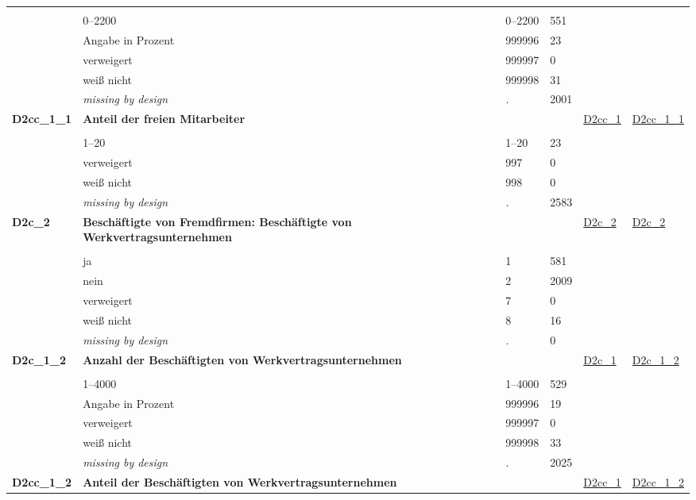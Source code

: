 \begin{longtable}{| L{2.45cm} | L{6cm} | C{1.5cm} | R{1cm} | C{2.25cm} | C{2.25cm} |}
   &  &  &  &  &  \\ 
   & 0--2200 & 0--2200 & 551 &  &  \\ 
   & Angabe in Prozent & 999996 & 23 &  &  \\ 
   & verweigert & 999997 & 0 &  &  \\ 
   & weiß nicht & 999998 & 31 &  &  \\ 
   & \textit{missing by design} & \textit{.} & 2001 &  &  \\ 
   \midrule
\textbf{D2cc\_1\_1}\label{var:D2cc:1:1} & \textbf{Anteil der freien Mitarbeiter} &  &  & \hyperref[D2cc:1]{D2cc\_1} & \hyperref[var:suf:D2cc:1:1]{D2cc\_1\_1} \\ 
   &  &  &  &  &  \\ 
   & 1--20 & 1--20 & 23 &  &  \\ 
   & verweigert & 997 & 0 &  &  \\ 
   & weiß nicht & 998 & 0 &  &  \\ 
   & \textit{missing by design} & \textit{.} & 2583 &  &  \\ 
   \midrule
\textbf{D2c\_2}\label{var:D2c:2} & \textbf{Beschäftigte von Fremdfirmen: Beschäftigte von Werkvertragsunternehmen} &  &  & \hyperref[D2c:2]{D2c\_2} & \hyperref[var:suf:D2c:2]{D2c\_2} \\ 
   &  &  &  &  &  \\ 
   & ja & 1 & 581 &  &  \\ 
   & nein & 2 & 2009 &  &  \\ 
   & verweigert & 7 & 0 &  &  \\ 
   & weiß nicht & 8 & 16 &  &  \\ 
   & \textit{missing by design} & \textit{.} & 0 &  &  \\ 
   \midrule
\textbf{D2c\_1\_2}\label{var:D2c:1:2} & \textbf{Anzahl der Beschäftigten von Werkvertragsunternehmen} &  &  & \hyperref[D2c:1]{D2c\_1} & \hyperref[var:suf:D2c:1:2]{D2c\_1\_2} \\ 
   &  &  &  &  &  \\ 
   & 1--4000 & 1--4000 & 529 &  &  \\ 
   & Angabe in Prozent & 999996 & 19 &  &  \\ 
   & verweigert & 999997 & 0 &  &  \\ 
   & weiß nicht & 999998 & 33 &  &  \\ 
   & \textit{missing by design} & \textit{.} & 2025 &  &  \\ 
   \midrule
\textbf{D2cc\_1\_2}\label{var:D2cc:1:2} & \textbf{Anteil der Beschäftigten von Werkvertragsunternehmen} &  &  & \hyperref[D2cc:1]{D2cc\_1} & \hyperref[var:suf:D2cc:1:2]{D2cc\_1\_2} \\ 

\end{longtable}
